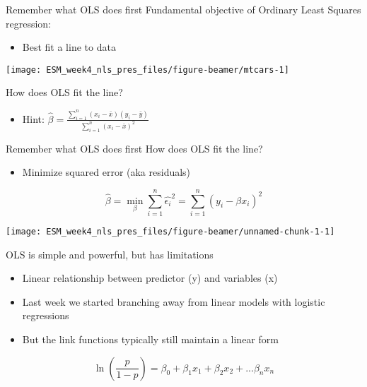 \documentclass[
  ignorenonframetext,
]{beamer}
\providecommand{\tightlist}{%
  \setlength{\itemsep}{0pt}\setlength{\parskip}{0pt}}
\begin{document}
\begin{frame}{Remember what OLS does first}
\protect\hypertarget{remember-what-ols-does-first}{}
Fundamental objective of Ordinary Least Squares regression:

\begin{itemize}[<+->]
\tightlist
\item
  Best fit a line to data
\end{itemize}

\begin{center}\texttt{[image: ESM\_week4\_nls\_pres\_files/figure-beamer/mtcars-1]} \end{center}

How does OLS fit the line?

\begin{itemize}[<+->]
\tightlist
\item
  Hint:
  \(\hat{\beta}=\frac{\sum^n_{i=1}(x_i-\bar{x})(y_i-\bar{y})}{\sum^n_{i=1}(x_i-\bar{x})^2}\)
\end{itemize}
\end{frame}

\begin{frame}{Remember what OLS does first}
\protect\hypertarget{remember-what-ols-does-first-1}{}
How does OLS fit the line?

\begin{itemize}
\tightlist
\item
  Minimize squared error (aka residuals)
\end{itemize}

\[
\hat\beta=\min_\beta \sum^n_{i=1}\hat{\epsilon_i}^2=\sum^n_{i=1}(y_i-\beta x_i)^2
\]

\begin{center}\texttt{[image: ESM\_week4\_nls\_pres\_files/figure-beamer/unnamed-chunk-1-1]} \end{center}
\end{frame}

\begin{frame}{OLS is simple and powerful, but has limitations}
\protect\hypertarget{ols-is-simple-and-powerful-but-has-limitations}{}
\begin{itemize}
\item
  Linear relationship between predictor (y) and variables (x)
\item
  Last week we started branching away from linear models with logistic
  regressions
\item
  But the link functions typically still maintain a linear form
\end{itemize}

\[
\ln(\frac{p}{1-p})=\beta_0+\beta_1x_1+\beta_2x_2+...\beta_nx_n
\]
\end{frame}
\end{document}
